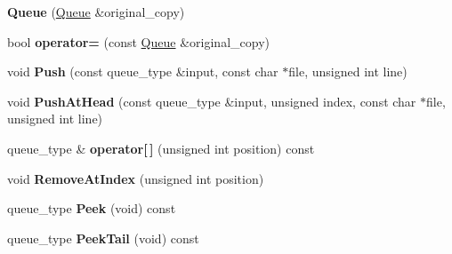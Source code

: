 \begin{DoxyCompactItemize}
\item 
\hypertarget{class_data_structures_1_1_queue_a08961b3e64cf46e27874c247889e1659}{{\bfseries Queue} (\hyperlink{class_data_structures_1_1_queue}{Queue} \&original\-\_\-copy)}\label{class_data_structures_1_1_queue_a08961b3e64cf46e27874c247889e1659}

\item 
\hypertarget{class_data_structures_1_1_queue_ae20f03f585b7cf73180f164b9d181165}{bool {\bfseries operator=} (const \hyperlink{class_data_structures_1_1_queue}{Queue} \&original\-\_\-copy)}\label{class_data_structures_1_1_queue_ae20f03f585b7cf73180f164b9d181165}

\item 
\hypertarget{class_data_structures_1_1_queue_ae564a88f3367a786777694e778a4500d}{void {\bfseries Push} (const queue\-\_\-type \&input, const char $\ast$file, unsigned int line)}\label{class_data_structures_1_1_queue_ae564a88f3367a786777694e778a4500d}

\item 
\hypertarget{class_data_structures_1_1_queue_a3980613e44a80982708b9d1f49fa0fea}{void {\bfseries Push\-At\-Head} (const queue\-\_\-type \&input, unsigned index, const char $\ast$file, unsigned int line)}\label{class_data_structures_1_1_queue_a3980613e44a80982708b9d1f49fa0fea}

\item 
\hypertarget{class_data_structures_1_1_queue_a210a76360bee7d4246990b8c99e7f259}{queue\-\_\-type \& {\bfseries operator\mbox{[}$\,$\mbox{]}} (unsigned int position) const }\label{class_data_structures_1_1_queue_a210a76360bee7d4246990b8c99e7f259}

\item 
\hypertarget{class_data_structures_1_1_queue_a8be7c3107161bb2ad869a9a6bb60605a}{void {\bfseries Remove\-At\-Index} (unsigned int position)}\label{class_data_structures_1_1_queue_a8be7c3107161bb2ad869a9a6bb60605a}

\item 
\hypertarget{class_data_structures_1_1_queue_a5e9c9de11d2dd84320d2f7c9408b80b1}{queue\-\_\-type {\bfseries Peek} (void) const }\label{class_data_structures_1_1_queue_a5e9c9de11d2dd84320d2f7c9408b80b1}

\item 
\hypertarget{class_data_structures_1_1_queue_a868069bfcac2e9d9294dadcd74bbe96c}{queue\-\_\-type {\bfseries Peek\-Tail} (void) const }\label{class_data_structures_1_1_queue_a868069bfcac2e9d9294dadcd74bbe96c}


\end{DoxyCompactItemize}
